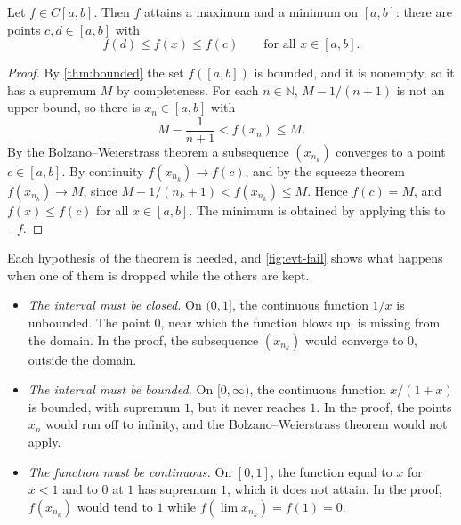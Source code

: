 \begin{theorem}
\label{thm:evt}
Let $f\in C[a,b]$. Then $f$ attains a maximum and a minimum on $[a,b]$: there are points $c,d\in[a,b]$ with
\[
f(d)\le f(x)\le f(c)\qquad\text{for all }x\in[a,b].
\]
\end{theorem}

\begin{proof}
By \cref{thm:bounded} the set $f([a,b])$ is bounded, and it is nonempty, so it has a supremum $M$ by completeness. For each $n\in\mathbb N$, $M-1/(n+1)$ is not an upper bound, so there is $x_n\in[a,b]$ with
\[
M-\frac1{n+1}<f(x_n)\le M .
\]
By the Bolzano--Weierstrass theorem a subsequence $(x_{n_k})$ converges to a point $c\in[a,b]$. By continuity $f(x_{n_k})\to f(c)$, and by the squeeze theorem $f(x_{n_k})\to M$, since $M-1/(n_k+1)<f(x_{n_k})\le M$. Hence $f(c)=M$, and $f(x)\le f(c)$ for all $x\in[a,b]$. The minimum is obtained by applying this to $-f$.
\end{proof}

Each hypothesis of the theorem is needed, and \cref{fig:evt-fail} shows what happens when one of them is dropped while the others are kept.
\begin{itemize}
\item \emph{The interval must be closed.} On $(0,1]$, the continuous function $1/x$ is unbounded. The point $0$, near which the function blows up, is missing from the domain. In the proof, the subsequence $(x_{n_k})$ would converge to $0$, outside the domain.
\item \emph{The interval must be bounded.} On $[0,\infty)$, the continuous function $x/(1+x)$ is bounded, with supremum $1$, but it never reaches $1$. In the proof, the points $x_n$ would run off to infinity, and the Bolzano--Weierstrass theorem would not apply.
\item \emph{The function must be continuous.} On $[0,1]$, the function equal to $x$ for $x<1$ and to $0$ at $1$ has supremum $1$, which it does not attain. In the proof, $f(x_{n_k})$ would tend to $1$ while $f(\lim x_{n_k})=f(1)=0$.
\end{itemize}

